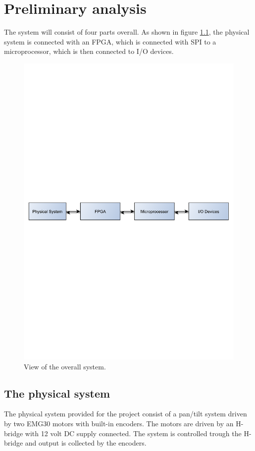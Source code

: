 


\chapter{Preliminary analysis}
The system will consist of four parts overall. As shown in figure \ref{fig:firstsystem}, the physical system is connected with an FPGA, which is connected with SPI to a microprocessor,  which is then connected to I/O devices.

\begin{figure}[htb]
\centering
\includegraphics[scale=0.56,trim=400 380 400 380]{graphics/firstsystem.pdf} %
\caption{View of the overall system.}
\label{fig:firstsystem}	
\end{figure}

\section{The physical system}\label{sec:physicalsystem}
The physical system provided for the project consist of a pan/tilt system driven by two EMG30 \cite{emg30} motors with built-in encoders. The motors are driven by an H-bridge \cite{hbridge} with 12 volt DC supply connected. The system is controlled trough the H-bridge and output is collected by the encoders.

